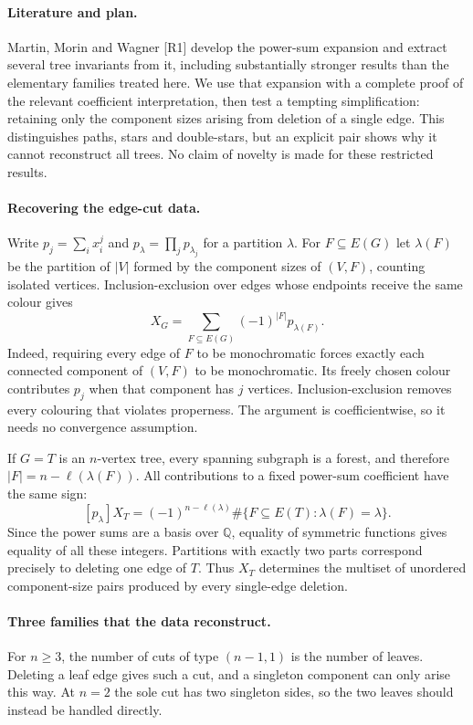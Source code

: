 \documentclass[11pt,a4paper]{article}
\begin{document}
\paragraph{Literature and plan.}
Martin, Morin and Wagner [R1] develop the power-sum expansion and extract
several tree invariants from it, including substantially stronger results
than the elementary families treated here. We use that expansion with
a complete proof of the relevant coefficient interpretation, then test
a tempting simplification: retaining only the component sizes arising
from deletion of a single edge. This distinguishes paths, stars and
double-stars, but an explicit pair shows why it cannot reconstruct
all trees. No claim of novelty is made for these restricted results.

\paragraph{Recovering the edge-cut data.}
Write $p_j=\sum_i x_i^j$ and $p_\lambda=\prod_jp_{\lambda_j}$ for a
partition $\lambda$. For $F\subseteq E(G)$ let $\lambda(F)$ be the
partition of $|V|$ formed by the component sizes of $(V,F)$, counting
isolated vertices. Inclusion-exclusion over edges whose endpoints
receive the same colour gives
\[
 X_G=\sum_{F\subseteq E(G)}(-1)^{|F|}p_{\lambda(F)}.
\]
Indeed, requiring every edge of $F$ to be monochromatic forces exactly
each connected component of $(V,F)$ to be monochromatic. Its freely
chosen colour contributes $p_j$ when that component has $j$ vertices.
Inclusion-exclusion removes every colouring that violates properness.
The argument is coefficientwise, so it needs no convergence assumption.

If $G=T$ is an $n$-vertex tree, every spanning subgraph is a forest,
and therefore $|F|=n-\ell(\lambda(F))$. All contributions to a fixed
power-sum coefficient have the same sign:
\[
 [p_\lambda]X_T=(-1)^{n-\ell(\lambda)}
 \#\{F\subseteq E(T):\lambda(F)=\lambda\}.
\]
Since the power sums are a basis over $\mathbb Q$, equality of symmetric
functions gives equality of all these integers. Partitions with exactly
two parts correspond precisely to deleting one edge of $T$.
Thus $X_T$ determines the multiset of unordered component-size pairs
produced by every single-edge deletion.

\paragraph{Three families that the data reconstruct.}
For $n\ge3$, the number of cuts of type $(n-1,1)$ is the number of
leaves. Deleting a leaf edge gives such a cut, and a singleton component
can only arise this way. At $n=2$ the sole cut has two singleton sides,
so the two leaves should instead be handled directly.
\end{document}
